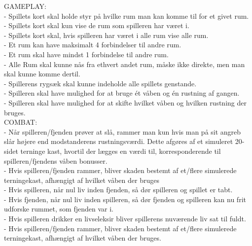   GAMEPLAY:\\
    - Spillets kort skal holde styr på hvilke rum man kan komme til for et givet rum.\\
    - Spillets kort skal kun vise de rum som spilleren har været i.\\
    - Spillets kort skal, hvis spilleren har været i alle rum vise alle rum.\\
    
    - Et rum kan have maksimalt 4 forbindelser til andre rum.\\
    - Et rum skal have mindst 1 forbindelse til andre rum.\\
    - Alle Rum skal kunne nås fra ethvert andet rum, måske ikke direkte, men man skal kunne komme dertil.\\
    
    - Spillerens rygsæk skal kunne indeholde alle spillets genstande.\\
    - Spilleren skal have mulighed for at bruge ét våben og én rustning af gangen.\\
    - Spilleren skal have mulighed for at skifte hvilket våben og hvilken rustning der bruges.\\
   
  COMBAT:\\
    - Når spilleren/fjenden prøver at slå, rammer man kun hvis man på sit angreb slår højere end modstanderens rustningsværdi. Dette afgøres af et simuleret 20-sidet terninge kast, hvortil der lægges en værdi til, korresponderende til spilleren/fjendens våben bonusser.\\
    - Hvis spilleren/fjenden rammer, bliver skaden bestemt af et/flere simulerede terningekast, afhængigt af hvilket våben der bruges\\
    - Hvis spilleren, når nul liv inden fjenden, så dør spilleren og spillet er tabt.\\
    - Hvis fjenden, når nul liv inden spilleren, så dør fjenden og spilleren kan nu frit udforske rummet, som fjenden var i.\\
    - Hvis spilleren drikker en livseleksir bliver spillerens nuværende liv sat til fuldt.\\
    - Hvis spilleren/fjenden rammer, bliver skaden bestemt af et/flere simulerede terningekast, afhængigt af hvilket våben der bruges.\\

